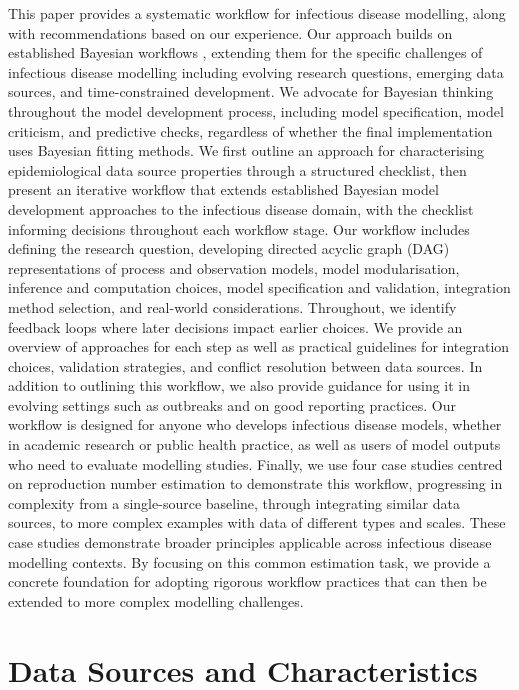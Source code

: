 \documentclass{article}
\begin{document}
This paper provides a systematic workflow for infectious disease modelling, along with recommendations based on our experience.
Our approach builds on established Bayesian workflows \citep{gelman2020bayesian}, extending them for the specific challenges of infectious disease modelling including evolving research questions, emerging data sources, and time-constrained development.
We advocate for Bayesian thinking throughout the model development process, including model specification, model criticism, and predictive checks, regardless of whether the final implementation uses Bayesian fitting methods.
We first outline an approach for characterising epidemiological data source properties through a structured checklist, then present an iterative workflow that extends established Bayesian model development approaches to the infectious disease domain, with the checklist informing decisions throughout each workflow stage.
Our workflow includes defining the research question, developing directed acyclic graph (DAG) representations of process and observation models, model modularisation, inference and computation choices, model specification and validation, integration method selection, and real-world considerations.
Throughout, we identify feedback loops where later decisions impact earlier choices.
We provide an overview of approaches for each step as well as practical guidelines for integration choices, validation strategies, and conflict resolution between data sources.
In addition to outlining this workflow, we also provide guidance for using it in evolving settings such as outbreaks and on good reporting practices.
Our workflow is designed for anyone who develops infectious disease models, whether in academic research or public health practice, as well as users of model outputs who need to evaluate modelling studies.
Finally, we use four case studies centred on reproduction number estimation to demonstrate this workflow, progressing in complexity from a single-source baseline, through integrating similar data sources, to more complex examples with data of different types and scales.
These case studies demonstrate broader principles applicable across infectious disease modelling contexts.
By focusing on this common estimation task, we provide a concrete foundation for adopting rigorous workflow practices that can then be extended to more complex modelling challenges.

\section{Data Sources and Characteristics} \label{sec:datareview}
\end{document}
